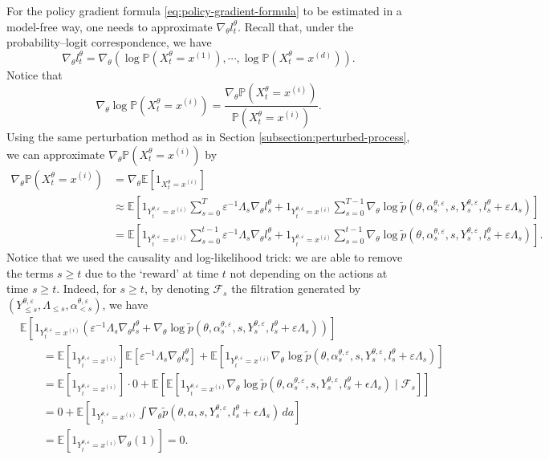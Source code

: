 \documentclass[11pt]{article}
\numberwithin{equation}{section}
\theoremstyle{definition}
\theoremstyle{remark}
\def\eps{\varepsilon}
\begin{document}
For the policy gradient formula \eqref{eq:policy-gradient-formula} to be estimated in a model-free way, one needs to approximate $\nabla_{\theta} l_t^\theta$.
Recall that, under the probability--logit correspondence, we have
\[
\nabla_{\theta} l_t^\theta = \nabla_{\theta}\left( \log \mathbb P(X_t^\theta = x^{(1)}), \cdots, \log \mathbb P(X_t^\theta = x^{(d)})\right).
\]
Notice that 
\[
\nabla_{\theta} \log \mathbb P(X_t^\theta = x^{(i)}) = \frac{\nabla_\theta \mathbb P (X_t^\theta = x^{(i)})}{\mathbb P (X_t^\theta = x^{(i)})}.
\]
Using the same perturbation method as in Section \ref{subsection:perturbed-process}, we can approximate $\nabla_{\theta} \mathbb P(X_t^\theta= x^{(i)})$ by
\[
\begin{aligned}
    \nabla_\theta \mathbb P (X_t^\theta= x^{(i)}) &= \nabla_{\theta} \mathbb E \left[ 1_{X_t^\theta = x^{(i)}} \right] \\
    &\approx  \mathbb E \left[ 1_{Y_t^{\theta,\eps} = x^{(i)}} \sum_{s = 0}^{T} \eps^{-1} \Lambda_s \nabla_\theta l_s^\theta +  1_{Y_t^{\theta,\eps} = x^{(i)}} \sum_{s = 0}^{T-1} \nabla_{\theta} \log \tilde p(\theta, \alpha_s^{\theta, \eps},s,  Y_s^{\theta, \eps},l_s^\theta + \eps \Lambda_s)\right] \\
    &= \mathbb E \left[ 1_{Y_t^{\theta,\eps} = x^{(i)}} \sum_{s = 0}^{t-1} \eps^{-1} \Lambda_s  \nabla_\theta l_s^\theta  +  1_{Y_t^{\theta,\eps} = x^{(i)}} \sum_{s = 0}^{t-1} \nabla_{\theta} \log \tilde p(\theta, \alpha_s^{\theta, \eps},s,  Y_s^{\theta, \eps},l_s^\theta + \eps \Lambda_s)\right].
\end{aligned}
\]
Notice that we used the causality and log-likelihood trick: we are able to remove the terms $s \geq t$ due to the `reward' at time $t$ not depending on the actions at time $s \geq t$. Indeed, for $s \geq t$, by denoting $\mathcal F_s$ the filtration generated by $(Y_{\leq s}^{\theta, \eps}, \Lambda_{\leq s}, \alpha_{ < s}^{\theta, \eps})$, we have
\[
\begin{aligned}
&\mathbb E \left[ 1_{Y_t^{\theta,\eps} = x^{(i)}} \left( \eps^{-1}\Lambda_s  \nabla_\theta l_s^\theta + \nabla_{\theta} \log \tilde p(\theta, \alpha_s^{\theta, \eps},s,  Y_s^{\theta, \eps},l_s^\theta + \eps \Lambda_s) \right)\right] \\ 
& \qquad= \mathbb E \left[ 1_{Y_t^{\theta,\eps} = x^{(i)}} \right] \mathbb E \left[\eps^{-1}\Lambda_s  \nabla_\theta l_s^\theta\right] + \mathbb E \left[ 1_{Y_t^{\theta,\eps} = x^{(i)}} \nabla_{\theta} \log \tilde p(\theta, \alpha_s^{\theta, \eps},s,  Y_s^{\theta, \eps},l_s^\theta + \eps \Lambda_s)  \right] \\ 
&\qquad = \mathbb E \left[ 1_{Y_t^{\theta,\eps} = x^{(i)}} \right] \cdot 0 + \mathbb E \left[ \mathbb E \left[ 1_{Y_t^{\theta,\eps} = x^{(i)}} \nabla_{\theta} \log \tilde p(\theta, \alpha_s^{\theta, \eps},s, Y_s^{\theta, \eps}, l_s^\theta + \epsilon \Lambda_s) \mid \mathcal{F}_s \right] \right] \\
& \qquad= 0 + \mathbb E \left[ 1_{Y_t^{\theta,\eps} = x^{(i)}} \int \nabla_{\theta} \tilde p(\theta, a, s, Y_s^{\theta, \eps}, l_s^\theta + \epsilon \Lambda_s) \, da \right] \\
&\qquad = \mathbb E \left[ 1_{Y_t^{\theta,\eps} = x^{(i)}} \nabla_{\theta} (1) \right] = 0. 
\end{aligned}
\]
\end{document}
